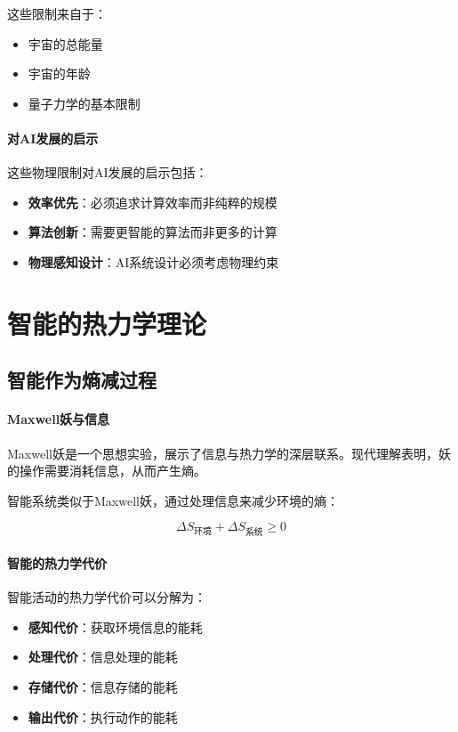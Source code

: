这些限制来自于：
\begin{itemize}
\item 宇宙的总能量
\item 宇宙的年龄
\item 量子力学的基本限制
\end{itemize}

\paragraph{对AI发展的启示}
这些物理限制对AI发展的启示包括：
\begin{itemize}
\item \textbf{效率优先}：必须追求计算效率而非纯粹的规模
\item \textbf{算法创新}：需要更智能的算法而非更多的计算
\item \textbf{物理感知设计}：AI系统设计必须考虑物理约束
\end{itemize}

\section{智能的热力学理论}

\subsection{智能作为熵减过程}

\paragraph{Maxwell妖与信息}
Maxwell妖是一个思想实验，展示了信息与热力学的深层联系。现代理解表明，妖的操作需要消耗信息，从而产生熵。

智能系统类似于Maxwell妖，通过处理信息来减少环境的熵：

$$\Delta S_{\text{环境}} + \Delta S_{\text{系统}} \geq 0$$

\paragraph{智能的热力学代价}
智能活动的热力学代价可以分解为：
\begin{itemize}
\item \textbf{感知代价}：获取环境信息的能耗
\item \textbf{处理代价}：信息处理的能耗
\item \textbf{存储代价}：信息存储的能耗
\item \textbf{输出代价}：执行动作的能耗
\end{itemize}

